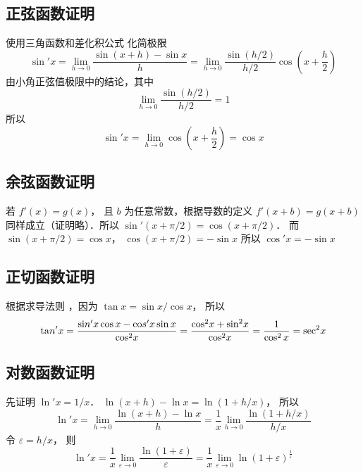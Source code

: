 \subsection{正弦函数证明}
使用三角函数和差化积公式%
化简极限
\begin{equation}
\sin'x = \mathop {\lim }\limits_{h \to 0} \frac{{\sin (x + h) - \sin x}}{h} = \mathop {\lim }\limits_{h \to 0} \frac{{\sin (h/2)}}{{h/2}}\cos \left( {x + \frac{h}{2}} \right)
\end{equation}
由小角正弦值极限中的结论，其中
\begin{equation}
\lim\limits_{h \to 0} \frac{\sin (h/2)}{h/2} = 1
\end{equation}
所以
\begin{equation}
\sin'x =  \mathop {\lim }\limits_{h \to 0}\cos \left( {x + \frac{h}{2}} \right) = \cos x
\end{equation}

\subsection{余弦函数证明}
若 $f'\left( x \right) = g\left( x \right)$， 且 $b$ 为任意常数，根据导数的定义 $f'(x + b) = g(x + b)$ 同样成立（证明略）．所以 $\sin'(x + \pi/2) = \cos(x + {\pi }/{2})$． 而 $\sin(x + {\pi }/{2}) = \cos x$，  $\cos(x + {\pi }/{2}) =  - \sin x$ 所以 $\cos' x =  - \sin x$

\subsection{正切函数证明}
根据求导法则%
，因为 $\tan x = {{\sin x}}/{{\cos x}}$， 所以
 \begin{equation}
{\mathop{\rm ta}\nolimits} n'x = \frac{{{\mathop{\rm si}\nolimits} n'x\cos x - {\mathop{\rm co}\nolimits} s'x\sin x}}{{{{\cos }^2}x}} = \frac{{{{\cos }^2}x + {{\sin }^2}x}}{{{{\cos }^2}x}} = \frac{1}{\cos ^2 x} = {\sec ^2}x
\end{equation}
\subsection{对数函数证明}
先证明 $\ln' x = {1}/{x}$．  $\ln \left( {x + h} \right) - \ln x = \ln \left( {1 + h/x} \right)$， 所以
 \begin{equation}
\ln 'x = \mathop {\lim }\limits_{h \to 0} \frac{{\ln \left( {x + h} \right) - \ln x}}{h} = \frac{1}{x}\mathop {\lim }\limits_{h \to 0} \frac{{\ln \left( {1 + h/x} \right)}}{{h/x}}
\end{equation}
令 $\varepsilon  = h/x$， 则
\begin{equation}
\ln' x = \frac{1}{x}\mathop {\lim }\limits_{\varepsilon  \to 0} \frac{{\ln \left( {1 + \varepsilon } \right)}}{\varepsilon } = \frac{1}{x}\mathop {\lim }\limits_{\varepsilon  \to 0} \ln {\left( {1 + \varepsilon } \right)^{\frac{1}{\varepsilon }}} 
\end{equation}
 
